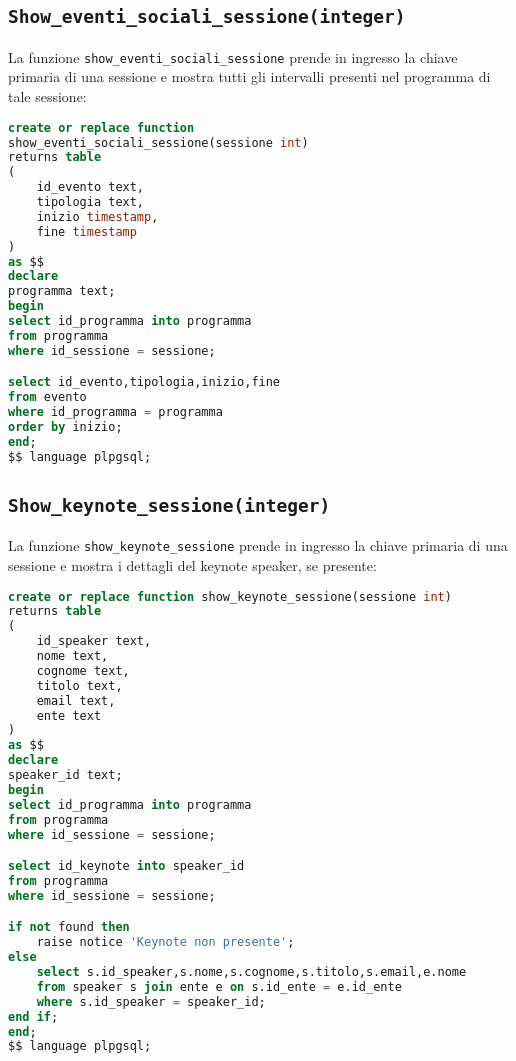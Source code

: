 \subsection{\texttt{Show\_eventi\_sociali\_sessione(integer)}}
La funzione \texttt{show\_eventi\_sociali\_sessione} prende in ingresso la chiave primaria di una sessione e mostra tutti gli intervalli presenti nel programma di tale sessione:
\begin{lstlisting}[language=SQL,style=mystyle]
create or replace function 
show_eventi_sociali_sessione(sessione int)
returns table
(
	id_evento text,
	tipologia text,
	inizio timestamp,
	fine timestamp
) 
as $$
declare 
programma text;
begin
select id_programma into programma
from programma
where id_sessione = sessione;

select id_evento,tipologia,inizio,fine
from evento
where id_programma = programma
order by inizio;
end;
$$ language plpgsql;
\end{lstlisting}
\subsection{\texttt{Show\_keynote\_sessione(integer)}}
La funzione \texttt{show\_keynote\_sessione} prende in ingresso la chiave primaria di una sessione e mostra i dettagli del keynote speaker, se presente:
\begin{lstlisting}[language=SQL,style=mystyle]
create or replace function show_keynote_sessione(sessione int)
returns table
(
	id_speaker text,
	nome text,
	cognome text,
	titolo text,
	email text,
	ente text
) 
as $$
declare
speaker_id text;
begin
select id_programma into programma
from programma
where id_sessione = sessione;

select id_keynote into speaker_id
from programma
where id_sessione = sessione;

if not found then
	raise notice 'Keynote non presente';
else
	select s.id_speaker,s.nome,s.cognome,s.titolo,s.email,e.nome
	from speaker s join ente e on s.id_ente = e.id_ente
	where s.id_speaker = speaker_id;
end if;
end;
$$ language plpgsql;
\end{lstlisting}
